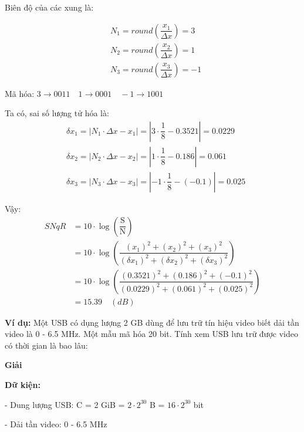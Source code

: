 Biên độ của các xung là: 

\[
    \begin{aligned}
        &N_1 = round\left(\dfrac{x_1}{\Delta x}\right) = 3\\[6pt]
        &N_2 = round\left(\dfrac{x_2}{\Delta x}\right) = 1\\[6pt]
        &N_3 = round\left(\dfrac{x_3}{\Delta x}\right) = -1
    \end{aligned}
\]

Mã hóa: $3 \rightarrow 0011 \quad 1 \rightarrow 0001 \quad -1 \rightarrow 1001$

Ta có, sai số lượng tử hóa là:
\[
    \begin{aligned}
        &\delta x_1 = |N_1 \cdot \Delta x - x_1| = \left|3  \cdot \dfrac{1}{8} - 0.3521\right| = 0.0229 \\[6pt]
        &\delta x_2 = |N_2 \cdot \Delta x - x_2| = \left|1  \cdot \dfrac{1}{8} - 0.186\right| = 0.061 \\[6pt]
        &\delta x_3 = |N_3 \cdot \Delta x - x_3| = \left|-1  \cdot \dfrac{1}{8} - (-0.1)\right| = 0.025
    \end{aligned}
\]

Vậy:
\[
    \begin{aligned}
        SNqR &= 10 \cdot \log \left(\dfrac{\text{S}}{\text{N}}\right)\\[6pt]
             &= 10 \cdot \log \left(\dfrac{(x_1)^2 + (x_2)^2 + (x_3)^2}{(\delta x_1)^2 + (\delta x_2)^2 + (\delta x_3)^2}\right)\\[6pt]
             &= 10 \cdot \log \left(\dfrac{(0.3521)^2 + (0.186)^2 + (-0.1)^2}{(0.0229)^2 + (0.061)^2 + (0.025)^2}\right)\\[6pt]
             &= 15.39 \quad (dB)
    \end{aligned}
\]

\noindent\textbf{Ví dụ:} Một USB có dụng lượng 2 GB dùng để lưu trữ tín hiệu video biết dải tần video là 0 - 6.5 MHz. Một mẫu mã hóa 20 bit. Tính xem USB lưu trữ được video có thời gian là bao lâu:

\begin{center}
    \textbf{Giải}
\end{center}

\textbf{Dữ kiện:}

\hspace*{0.5cm}- Dung lượng USB: C = 2 GiB = $2 \cdot 2^{30}$ B = $16 \cdot 2^{30}$ bit

\hspace*{0.5cm}- Dải tần video: 0 - 6.5 MHz


